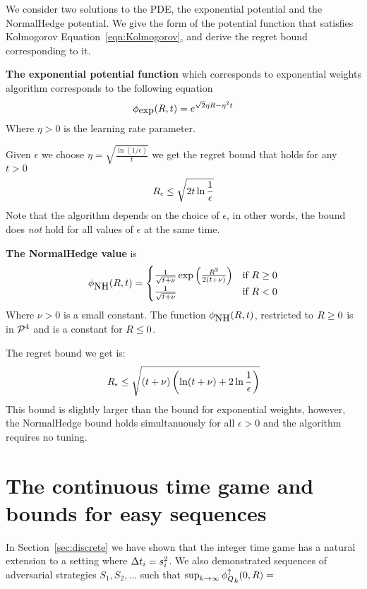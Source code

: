 \documentclass{article}[12pt]
\begin{document}
We consider two solutions to the PDE, the exponential potential and
the NormalHedge potential. We give the form of the potential function
that satisfies Kolmogorov Equation~\ref{eqn:Kolmogorov}, and derive
the regret bound corresponding to it.

{\bf The exponential potential function} which corresponds to exponential
  weights algorithm corresponds to the following equation
\[
    \phi_{\mbox{exp}}(R,t) = e^{\sqrt{2} \eta R - \eta^2 t}
  \]
  Where $\eta>0$ is the learning rate parameter.
  
Given $\epsilon$ we choose $\eta = \sqrt{\frac{\ln (1/\epsilon)}{t}}$
we get the regret bound that holds for any $t>0$
  \begin{equation}
    R_\epsilon \leq \sqrt{2 t \ln \frac{1}{\epsilon}}
  \end{equation}
Note that the algorithm depends on the choice of $\epsilon$, in other
words, the bound does {\em not} hold for all values of $\epsilon$ at
the same time.

{\bf The NormalHedge value} is
\begin{equation} \label{eqn:NormalHedge}
  \phi_{\mbox{NH}}(R,t) = \begin{cases}
    \frac{1}{\sqrt{t+\nu}}\exp\left(\frac{R^2}{2(t+\nu)}\right)
    & \mbox{if } R \geq 0  \\
  \frac{1}{\sqrt{t+\nu}} & \mbox{if } R <0
  \end{cases}
\end{equation}
Where $\nu>0$ is a small constant. The function $\phi_{\mbox{NH}}(R,t)$,
restricted to $R\geq 0$ is in ${\cal P}^{4}$ and is a constant for $R \leq 0$.

The regret bound we get is:
\begin{equation}
R_\epsilon \leq \sqrt{(t+\nu) \left( \ln (t+\nu) + 2 \ln \frac{1}{\epsilon}\right)}
\end{equation}
This bound is slightly larger than the bound for exponential weights,
however, the NormalHedge bound holds simultanuously for all
$\epsilon>0$ and the algorithm requires no tuning.

\section{The continuous time game and bounds for easy sequences} \label{sec:easy}
In Section~\ref{sec:discrete} we have shown that the integer time game
has a natural extension to a setting where $\Delta t_i = s_i^2$. We
also demonstrated sequences of adversarial strategies
$S_1,S_2,\ldots$ such that $\sup_{k \to \infty} {\phi_{Q}^{\uparrow}}_k(0,R) = $
\end{document}

